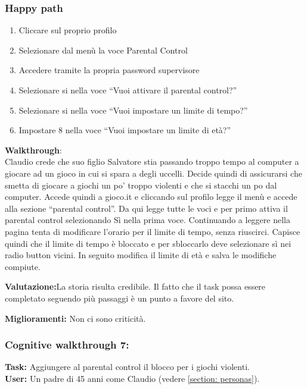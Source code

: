 \documentclass[../Report.tex]{subfiles}
\begin{document}
    \subsubsection{Happy path}
    \begin{enumerate}
        \item Cliccare sul proprio profilo
        \item Selezionare dal menù la voce Parental Control
        \item Accedere tramite la propria password supervisore
        \item         Selezionare si nella voce “Vuoi attivare il parental control?”
        \item Selezionare si nella voce “Vuoi impostare un limite di tempo?”
        \item Impostare 8 nella voce “Vuoi impostare un limite di età?”
    \end{enumerate}
    \textbf{Walkthrough}:\\
    Claudio crede che suo figlio Salvatore stia passando troppo tempo al computer a giocare ad un gioco in cui si spara a degli uccelli. Decide quindi di assicurarsi che smetta di giocare a giochi un po’ troppo violenti e che si stacchi un po dal computer. Accede quindi a gioco.it e cliccando sul profilo legge il menù e accede alla sezione “parental control”. Da qui legge tutte le voci e per primo attiva il parental control selezionando Sì nella prima voce. Continuando a leggere nella pagina tenta di modificare l’orario per il limite di tempo, senza riuscirci. Capisce quindi che il limite di tempo è bloccato e per sbloccarlo deve selezionare sì nei radio button vicini. In seguito modifica il limite di età e salva le modifiche compiute.  


    \textbf{Valutazione:}La storia risulta credibile. Il fatto che il task possa essere completato seguendo più passaggi è un punto a favore del sito.

    \textbf{Miglioramenti:} Non ci sono criticità.

    \subsubsection{Cognitive walkthrough 7:}
    \textbf{Task:} Aggiungere al parental control il blocco per i giochi violenti.\\
    \textbf{User:} Un padre di 45 anni come Claudio (vedere \ref{section: personas}).\\
\end{document}
